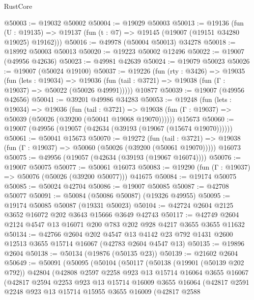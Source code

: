 \begin{lexlean}{RustCore}
\begin{coremodule}
@50003 := @19032 @50002
@50004 := @19029 @50003
@50013 := @19136
    (fun (U : @19135) => @19137 (fun (t : @7) => @19145 (@19007 (@19151 @34280 @19025) @19162)))
@50016 := @49978 (@50004 @50013) @34278
@50018 := @18992 @50003 @50013
@50020 := @19223 @50002 @12496
@50022 := @19007 (@49956 @42636)
@50023 := @49981 @42639
@50024 := @19079 @50023
@50026 := @19007 (@50024 @19100)
@50037 := @19226
    (fun (rty : @3426) =>
    @19035
      (fun (lets : @19034) =>
      @19036 (fun (tail : @3721) => @19038 (fun (Γ : @19037) => @50022 (@50026 @49991)))))
    @10877
@50039 := @19007 (@49956 @42656)
@50041 := @39201 @49986 @34283
@50053 := @19248
    (fun (lets : @19034) =>
    @19036
      (fun (tail : @3721) =>
      @19038 (fun (Γ : @19037) => @50039 (@50026 (@39200 (@50041 @19068 @19070))))))
    @15673
@50060 := @19007 (@49956 (@19057 (@42634 (@39193 (@19067 (@15674 @19070))))))
@50061 := @50041 @15673
@50070 := @19272
    (fun (tail : @3721) => @19038 (fun (Γ : @19037) => @50060 (@50026 (@39200 (@50061 @19070)))))
    @16073
@50075 := @49956 (@19057 (@42634 (@39193 (@19067 @16074))))
@50076 := @19007 @50075
@50077 := @50061 @16073
@50083 := @19290 (fun (Γ : @19037) => @50076 (@50026 (@39200 @50077))) @41675
@50084 := @19174 @50075
@50085 := @50024 @42704
@50086 := @19007 @50085
@50087 := @42708 @50077
@50091 := @50084 (@50086 @50087) (@19326 @49955)
@50095 := @19174 @50085 @50087 (@19331 @50023)
@50104 := @42724 @2604 @2125 @3652 @16072 @202 @3643 @15666 @3649 @42743
@50117 := @42749 @2604 @2124 @4547 @13 @16071 @200 @783 @202 @928 @4217 @3655 @3655 @11632
@50134 := @42766
    @2604
    @202
    @4547
    @13
    @4142
    @23
    @792
    @1431
    @2600
    @12513
    @3655
    @15714
    @16067
    (@42783 @2604 @4547 @13)
@50135 := @19896 @2604
@50138 := @50134 (@19876 (@50135 @23))
@50139 := @21602 @2604
@50649 := @50091
    (@50095
      (@50104
        (@50117
          (@50138
            (@19901 (@50139 @202 @792))
            @42804
            (@42808
              @2597
              @2258
              @923
              @13
              @15714
              @16064
              @3655
              @16067
              (@42817
                @2594
                @2253
                @923
                @13
                @15714
                @16009
                @3655
                @16064
                (@42817
                  @2591
                  @2248
                  @923
                  @13
                  @15714
                  @15955
                  @3655
                  @16009
                  (@42817
                    @2588

\end{coremodule}
\end{lexlean}
